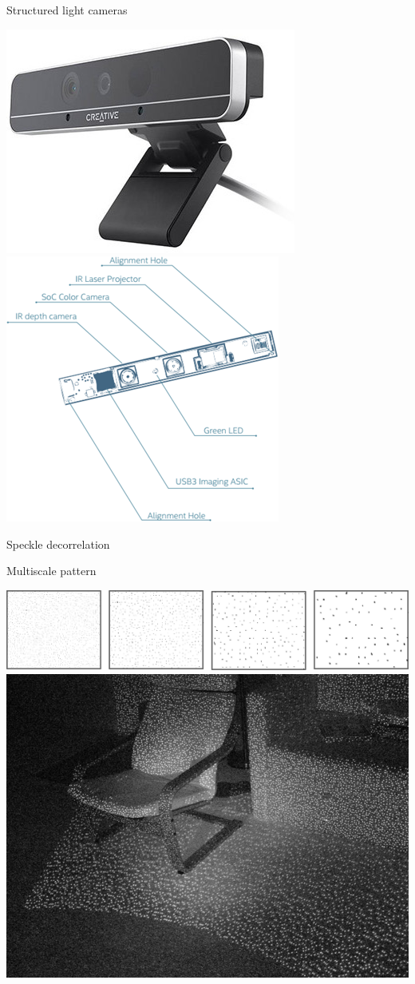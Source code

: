 \documentclass[compress]{beamer}
\begin{document}
\begin{frame}{Structured light cameras}
    \begin{center}
        \includegraphics[width=0.4\linewidth]{f200}
        \includegraphics[width=0.6\linewidth]{f200_module}
    \end{center}
\end{frame}


{
\begin{frame}{Speckle decorrelation}


\end{frame}
}


\begin{frame}{Multiscale pattern}
    \begin{center}
        \includegraphics[width=0.8\linewidth]{multiscale_kinect_pattern}\\
        \includegraphics[width=0.5\linewidth]{kinect_pattern2}

    \end{center}
\end{frame}
\end{document}
